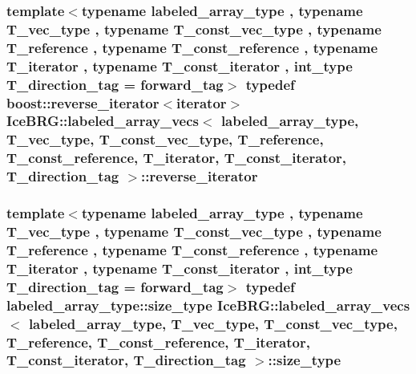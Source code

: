 \subsubsection[{reverse\+\_\+iterator}]{\setlength{\rightskip}{0pt plus 5cm}template$<$typename labeled\+\_\+array\+\_\+type , typename T\+\_\+vec\+\_\+type , typename T\+\_\+const\+\_\+vec\+\_\+type , typename T\+\_\+reference , typename T\+\_\+const\+\_\+reference , typename T\+\_\+iterator , typename T\+\_\+const\+\_\+iterator , int\+\_\+type T\+\_\+direction\+\_\+tag = forward\+\_\+tag$>$ typedef boost\+::reverse\+\_\+iterator$<${\bf iterator}$>$ {\bf Ice\+B\+R\+G\+::labeled\+\_\+array\+\_\+vecs}$<$ labeled\+\_\+array\+\_\+type, T\+\_\+vec\+\_\+type, T\+\_\+const\+\_\+vec\+\_\+type, T\+\_\+reference, T\+\_\+const\+\_\+reference, T\+\_\+iterator, T\+\_\+const\+\_\+iterator, T\+\_\+direction\+\_\+tag $>$\+::{\bf reverse\+\_\+iterator}}\label{classIceBRG_1_1labeled__array__vecs_ab3d90428e6ba03e8a3bcb3b44629e3f5}
\hypertarget{classIceBRG_1_1labeled__array__vecs_a9395382460f12145dc0c835e78283fdd}{}
\subsubsection[{size\+\_\+type}]{\setlength{\rightskip}{0pt plus 5cm}template$<$typename labeled\+\_\+array\+\_\+type , typename T\+\_\+vec\+\_\+type , typename T\+\_\+const\+\_\+vec\+\_\+type , typename T\+\_\+reference , typename T\+\_\+const\+\_\+reference , typename T\+\_\+iterator , typename T\+\_\+const\+\_\+iterator , int\+\_\+type T\+\_\+direction\+\_\+tag = forward\+\_\+tag$>$ typedef labeled\+\_\+array\+\_\+type\+::size\+\_\+type {\bf Ice\+B\+R\+G\+::labeled\+\_\+array\+\_\+vecs}$<$ labeled\+\_\+array\+\_\+type, T\+\_\+vec\+\_\+type, T\+\_\+const\+\_\+vec\+\_\+type, T\+\_\+reference, T\+\_\+const\+\_\+reference, T\+\_\+iterator, T\+\_\+const\+\_\+iterator, T\+\_\+direction\+\_\+tag $>$\+::{\bf size\+\_\+type}}\label{classIceBRG_1_1labeled__array__vecs_a9395382460f12145dc0c835e78283fdd}
\hypertarget{classIceBRG_1_1labeled__array__vecs_ac065b9242f4296223c4415479ca5f5c6}{}
